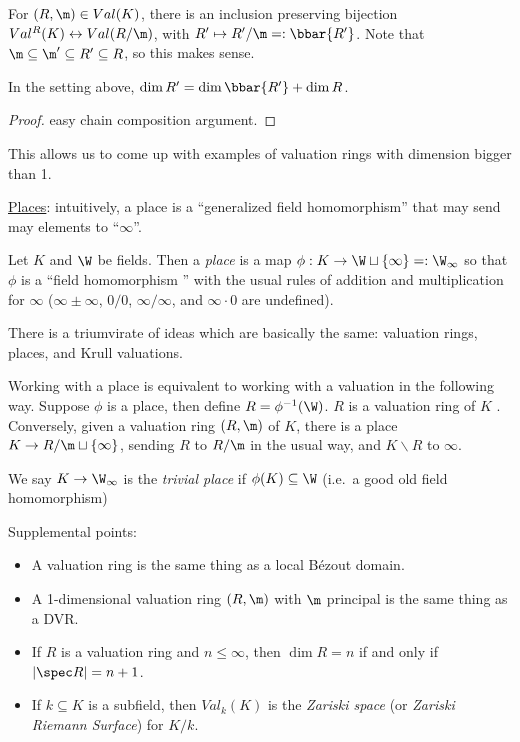  \begin{theorem}[4.13]
   For $(R,\m)\in Val(K)$, there is an inclusion preserving bijection
   $Val^R(K)\leftrightarrow Val(R/\m)$, with $R'\mapsto R'/\m =: \bbar {R'}$. Note that
   $\m\subseteq \m'\subseteq R'\subseteq R$, so this makes sense.
 \end{theorem}
 \begin{corollary}
   In the setting above, $\dim R' = \dim \bbar{R'} + \dim R$.
 \end{corollary}
 \begin{proof}
   easy chain composition argument.
 \end{proof}
 This allows us to come up with examples of valuation rings with dimension bigger than 1.

 \underline{Places}: intuitively, a place is a ``generalized field homomorphism'' that
 may send may elements to ``$\infty$''.
 \begin{definition}
   Let $K$ and $\W$ be fields. Then a \emph{place} is a map $\phi:K\to \W\sqcup
   \{\infty\} =: \W_\infty$ so that $\phi$ is a ``field homomorphism '' with the usual
   rules of addition and multiplication for $\infty$ ($\infty \pm \infty$, $0/0$,
   $\infty/\infty$, and $\infty\cdot 0$ are undefined).
 \end{definition}
 There is a triumvirate of ideas which are basically the same: valuation rings, places,
 and Krull valuations.

 Working with a place is equivalent to working with a valuation in the following way.
 Suppose $\phi$ is a place, then define $R=\phi^{-1}(\W)$. $R$ is a valuation ring of $K$
 \anton{}. Conversely, given a valuation ring $(R,\m)$ of $K$, there is a place $K\to
 R/\m \sqcup \{\infty\}$, sending $R$ to $R/\m$ in the usual way, and $K\smallsetminus R$
 to $\infty$.

 We say $K\to \W_\infty$ is the \emph{trivial place} if $\phi(K)\subseteq \W$ (i.e.~a
 good old field homomorphism)
 \setcounter{lecture}{32}

 Supplemental points:
 \begin{itemize}
   \item A valuation ring is the same thing as a local B\'ezout domain.
   \item A 1-dimensional valuation ring $(R,\m)$ with $\m$ principal is the same thing as a DVR.
   \item If $R$ is a valuation ring and $n\le \infty$, then $\dim R=n$ if and only if
   $|\spec R|=n+1$.
   \item If $k\subseteq K$ is a subfield, then $Val_k(K)$ is the \emph{Zariski space} (or
   \emph{Zariski Riemann Surface}) for $K/k$.
 \end{itemize}

